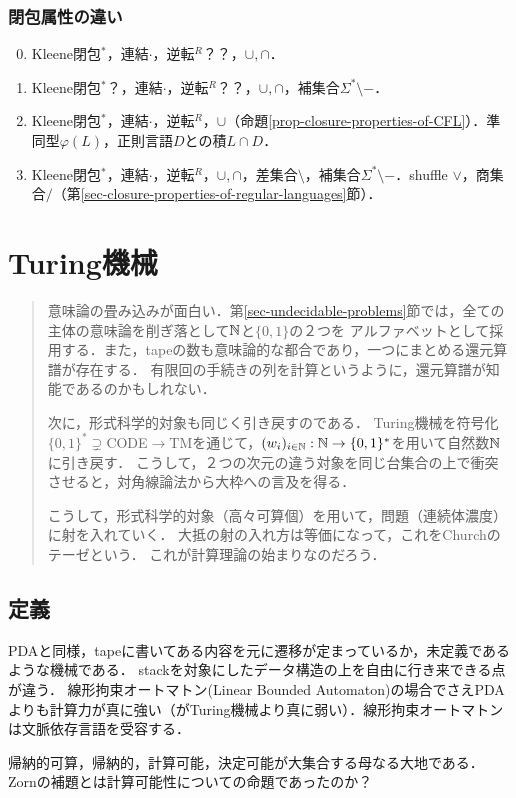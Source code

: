 \documentclass[uplatex, dvipdfmx]{jsreport}
\begin{document}
\subsection{閉包属性の違い}

\begin{enumerate}\setcounter{enumi}{-1}
    \item Kleene閉包${}^*$，連結$\cdot$，逆転${}^R$？？，$\cup,\cap$．
    \item Kleene閉包${}^*$？，連結$\cdot$，逆転${}^R$？？，$\cup,\cap$，補集合$\Sigma^*\setminus-$．
    \item Kleene閉包${}^*$，連結$\cdot$，逆転${}^R$，$\cup$（命題\ref{prop-closure-properties-of-CFL}）．準同型$\varphi(L)$，正則言語$D$との積$L\cap D$．
    \item Kleene閉包${}^*$，連結$\cdot$，逆転${}^R$，$\cup,\cap$，差集合$\setminus$，補集合$\Sigma^*\setminus-$．shuffle $\lor$，商集合$/$（第\ref{sec-closure-properties-of-regular-languages}節）．
\end{enumerate}

\chapter{Turing機械}

\begin{quotation}
    意味論の畳み込みが面白い．第\ref{sec-undecidable-problems}節では，全ての主体の意味論を削ぎ落として$\mathbb{N}$と$\{0,1\}$の２つを
    アルファベットとして採用する．また，tapeの数も意味論的な都合であり，一つにまとめる還元算譜が存在する．
    有限回の手続きの列を計算というように，還元算譜が知能であるのかもしれない．

    次に，形式科学的対象も同じく引き戻すのである．
    Turing機械を符号化$\{0,1\}^*\supsetneq$CODE$\to$TMを通じて，$(w_i)_{i\in\mathbb{N}}:\mathbb{N}\to\{0,1\}^*$を用いて自然数$\mathbb{N}$に引き戻す．
    こうして，２つの次元の違う対象を同じ台集合の上で衝突させると，対角線論法から大枠への言及を得る．

    こうして，形式科学的対象（高々可算個）を用いて，問題（連続体濃度）に射を入れていく．
    大抵の射の入れ方は等価になって，これをChurchのテーゼという．
    これが計算理論の始まりなのだろう．
\end{quotation}

\section{定義}

\begin{tcolorbox}[colframe=ForestGreen, colback=ForestGreen!10!white, breakable]
    PDAと同様，tapeに書いてある内容を元に遷移が定まっているか，未定義であるような機械である．
    stackを対象にしたデータ構造の上を自由に行き来できる点が違う．
    線形拘束オートマトン(Linear Bounded Automaton)の場合でさえPDAよりも計算力が真に強い（がTuring機械より真に弱い）．線形拘束オートマトンは文脈依存言語を受容する．

    帰納的可算，帰納的，計算可能，決定可能が大集合する母なる大地である．
    Zornの補題とは計算可能性についての命題であったのか？
\end{tcolorbox}
\end{document}
